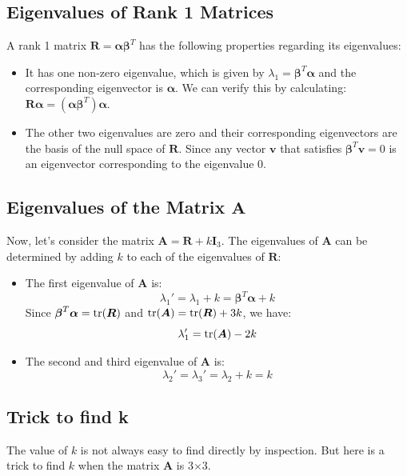 \documentclass{article}
\begin{document}
\subsection{Eigenvalues of Rank 1 Matrices}
A rank 1 matrix \( \boldsymbol R = \boldsymbol\alpha \boldsymbol\beta^{T} \) has the following properties regarding its eigenvalues:
\begin{itemize}
		\item It has one non-zero eigenvalue, which is given by \( \lambda_1 = 
			\boldsymbol\beta^{T} \boldsymbol\alpha \) and the corresponding 
			eigenvector is \( \boldsymbol\alpha \).
			We can verify this by calculating: $\boldsymbol R \boldsymbol\alpha
			= (\boldsymbol\alpha \boldsymbol\beta^{T}) \boldsymbol\alpha$.
		\item The other two eigenvalues are zero and 
			their corresponding eigenvectors are the basis 
			of the null space of \( \boldsymbol R \).
			Since any vector \( \boldsymbol v \) that satisfies
			\( \boldsymbol\beta^{T} \boldsymbol v = 0 \) is an eigenvector 
			corresponding to the eigenvalue 0.
\end{itemize}

\subsection{Eigenvalues of the Matrix \( \boldsymbol A \)}
Now, let's consider the matrix \( \boldsymbol A = \boldsymbol R + k\boldsymbol I_3 \).
The eigenvalues of \( \boldsymbol A \) can be determined by adding \( k \) to each of the eigenvalues of \( \boldsymbol R \):
\begin{itemize}
		\item The first eigenvalue of \( \boldsymbol A \) is:
			\[
			\lambda_1' = \lambda_1 + k = \boldsymbol\beta^{T} \boldsymbol\alpha + k
			\]
			Since $\boldsymbol\beta^{T}\boldsymbol\alpha=\operatorname{tr}(\boldsymbol R)$ and $\operatorname{tr}(\boldsymbol A)=\operatorname{tr}(\boldsymbol R)+3k$, we have:
			\[
			\lambda_1' = \operatorname{tr}(\boldsymbol A) - 2k
			\]
		\item The second and third eigenvalue of \( \boldsymbol A \) is:
			\[
			\lambda_2'=\lambda_3' = \lambda_2 + k = k
			\]
\end{itemize}

\subsection{Trick to find k}

The value of \( k \) is not always easy to find directly by inspection.
But here is a trick to find \( k \) when the matrix \( \boldsymbol A \) is 3$\times$3.
\end{document}
